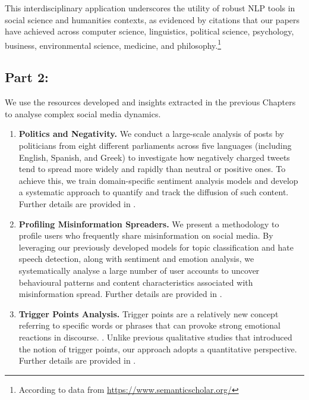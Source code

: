 This interdisciplinary application underscores the utility of robust \ac{NLP} tools in social science and humanities contexts, as evidenced by citations that our papers have achieved across computer science, linguistics, political science, psychology, business, environmental science, medicine, and philosophy.\footnote{According to data from \url{https://www.semanticscholar.org/}}


\subsection{Part 2: \PARTTWO} \label{ch:intro:contributions:part2}
We use the resources developed and insights extracted in the previous Chapters to analyse complex social media dynamics.

\begin{enumerate}[label=II.\arabic*]
    \item  \label{contribution:4}\textbf{Politics and Negativity.} We conduct a large-scale analysis of posts by politicians from eight different parliaments across five languages (including English, Spanish, and Greek) to investigate how negatively charged tweets tend to spread more widely and rapidly than neutral or positive ones. To achieve this, we train domain-specific sentiment analysis models and develop a systematic approach to quantify and track the diffusion of such content. Further details are provided in .
    \item \label{contribution:5} \textbf{Profiling Misinformation Spreaders.} We present a methodology to profile users who frequently share misinformation on social media. By leveraging our previously developed models for topic classification and hate speech detection, along with sentiment and emotion analysis, we systematically analyse a large number of user accounts to uncover behavioural patterns and content characteristics associated with misinformation spread. Further details are provided in .
    \item \label{contribution:6} \textbf{Trigger Points Analysis.} Trigger points are a relatively new concept referring to specific words or phrases that can provoke strong emotional reactions in discourse. . Unlike previous qualitative studies that introduced the notion of trigger points, our approach adopts a quantitative perspective. Further details are provided in .
\end{enumerate}


